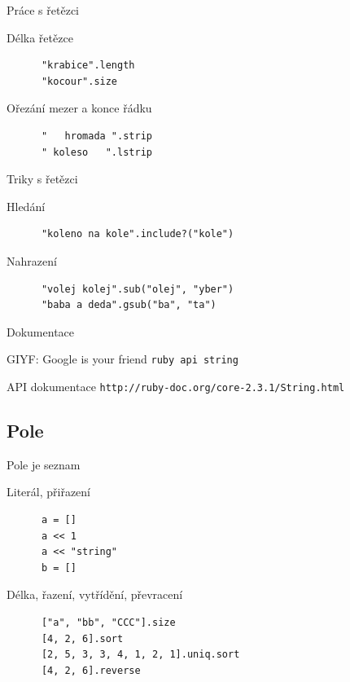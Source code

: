 \documentclass{beamer}
\begin{document}
\begin{frame}[fragile]{Práce s řetězci}
  \begin{block}{Délka řetězce}
    \begin{verbatim}
      "krabice".length
      "kocour".size
    \end{verbatim}
  \end{block}
  \pause
  \begin{block}{Ořezání mezer a konce řádku}
    \begin{verbatim}
      "   hromada ".strip
      " koleso   ".lstrip
    \end{verbatim}
  \end{block}
\end{frame}

\begin{frame}[fragile]{Triky s řetězci}
  \begin{block}{Hledání}
    \begin{verbatim}
      "koleno na kole".include?("kole")
    \end{verbatim}
  \end{block}
  \pause
  \begin{block}{Nahrazení}
    \begin{verbatim}
      "volej kolej".sub("olej", "yber")
      "baba a deda".gsub("ba", "ta")
    \end{verbatim}
  \end{block}
\end{frame}

\begin{frame}{Dokumentace}
  \begin{block}{GIYF: Google is your friend}
    \texttt{ruby api string}
  \end{block}
  \begin{block}{API dokumentace}
    \texttt{http://ruby-doc.org/core-2.3.1/String.html}
  \end{block}
\end{frame}

\subsection{Pole}

\begin{frame}[fragile]{Pole je seznam}
  \begin{block}{Literál, přiřazení}
    \begin{verbatim}
      a = []
      a << 1
      a << "string"
      b = []
    \end{verbatim}
  \end{block}
  \pause
  \begin{block}{Délka, řazení, vytřídění, převracení}
    \begin{verbatim}
      ["a", "bb", "CCC"].size
      [4, 2, 6].sort
      [2, 5, 3, 3, 4, 1, 2, 1].uniq.sort
      [4, 2, 6].reverse
    \end{verbatim}
  \end{block}
\end{frame}
\end{document}
